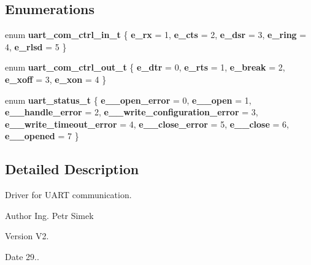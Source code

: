 \subsection*{Enumerations}
\begin{DoxyCompactItemize}
\item 
enum \textbf{ uart\+\_\+com\+\_\+ctrl\+\_\+in\+\_\+t} \{ \newline
{\bfseries e\+\_\+rx} = 1, 
{\bfseries e\+\_\+cts} = 2, 
{\bfseries e\+\_\+dsr} = 3, 
{\bfseries e\+\_\+ring} = 4, 
\newline
{\bfseries e\+\_\+rlsd} = 5
 \}
\item 
\mbox{\label{group___u_a_r_t_ga780849ccdce6e933c3adff0ed074aafa}} 
enum {\bfseries uart\+\_\+com\+\_\+ctrl\+\_\+out\+\_\+t} \{ \newline
{\bfseries e\+\_\+dtr} = 0, 
{\bfseries e\+\_\+rts} = 1, 
{\bfseries e\+\_\+break} = 2, 
{\bfseries e\+\_\+xoff} = 3, 
\newline
{\bfseries e\+\_\+xon} = 4
 \}
\item 
\mbox{\label{group___u_a_r_t_gaf7d6a356f1601c95992ab6990320fd35}} 
enum {\bfseries uart\+\_\+status\+\_\+t} \{ \newline
{\bfseries e\+\_\+\_\+open\+\_\+error} = 0, 
{\bfseries e\+\_\+\_\+open} = 1, 
{\bfseries e\+\_\+\_\+handle\+\_\+error} = 2, 
{\bfseries e\+\_\+\_\+write\+\_\+configuration\+\_\+error} = 3, 
\newline
{\bfseries e\+\_\+\_\+write\+\_\+timeout\+\_\+error} = 4, 
{\bfseries e\+\_\+\_\+close\+\_\+error} = 5, 
{\bfseries e\+\_\+\_\+close} = 6, 
{\bfseries e\+\_\+\_\+opened} = 7
 \}
\end{DoxyCompactItemize}


\subsection{Detailed Description}
Driver for U\+A\+RT communication. 

\begin{DoxyAuthor}{Author}
Ing. Petr Simek 
\end{DoxyAuthor}
\begin{DoxyVersion}{Version}
V2. 
\end{DoxyVersion}
\begin{DoxyDate}{Date}
29.. 
\end{DoxyDate}
